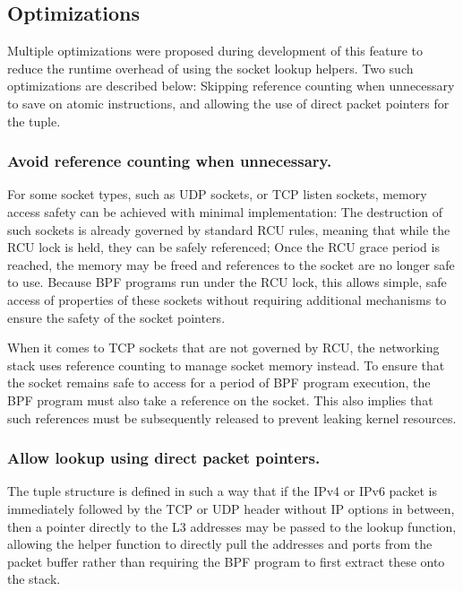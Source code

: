 \documentclass[10pt,sigconf,authorversion]{lpc}
\begin{document}
\subsection{Optimizations}

Multiple optimizations were proposed during development of this feature to
reduce the runtime overhead of using the socket lookup helpers. Two such
optimizations are described below: Skipping reference counting when unnecessary
to save on atomic instructions, and allowing the use of direct packet pointers
for the tuple.

\subsubsection{Avoid reference counting when unnecessary.}

For some socket types, such as UDP sockets, or TCP listen sockets, memory
access safety can be achieved with minimal implementation: The destruction of
such sockets is already governed by standard RCU rules, meaning that while the
RCU lock is held, they can be safely referenced; Once the RCU grace period is
reached, the memory may be freed and references to the socket are no longer
safe to use. Because BPF programs run under the RCU lock, this allows simple,
safe access of properties of these sockets without requiring additional
mechanisms to ensure the safety of the socket pointers.

When it comes to TCP sockets that are not governed by RCU, the networking stack
uses reference counting to manage socket memory instead. To ensure that the
socket remains safe to access for a period of BPF program execution, the BPF
program must also take a reference on the socket. This also implies that such
references must be subsequently released to prevent leaking kernel resources.

\subsubsection{Allow lookup using direct packet pointers.}

The tuple structure is defined in such a way that if the IPv4 or IPv6 packet is
immediately followed by the TCP or UDP header without IP options in between,
then a pointer directly to the L3 addresses may be passed to the lookup
function, allowing the helper function to directly pull the addresses and ports
from the packet buffer rather than requiring the BPF program to first extract
these onto the stack.
\end{document}
